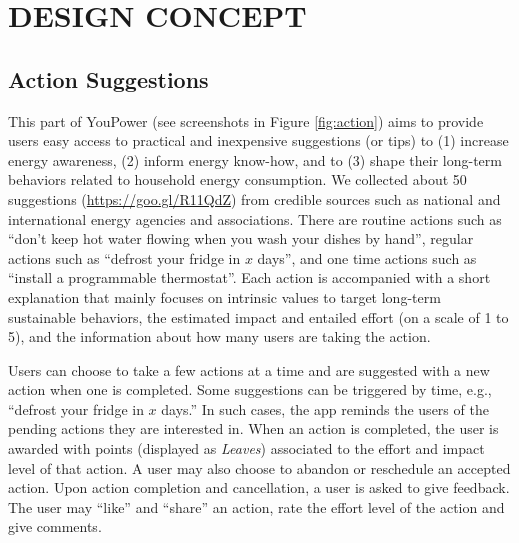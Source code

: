 
\section{\uppercase{Design Concept}}
\label{sect:design_concept}

\subsection{Action Suggestions}
\label{sect:tips}

\begin{figure*}[t!]
\centering
\caption{Action suggestion part of YouPower}
\label{fig:action}
\end{figure*}

This part of YouPower (see screenshots in Figure \ref{fig:action}) aims to provide users easy access to practical and inexpensive suggestions (or tips) to (1) increase energy awareness, (2) inform energy know-how, and to (3) shape their long-term behaviors related to household energy consumption.
% 
We collected about 50 suggestions (\url{https://goo.gl/R11QdZ}) from credible sources such as national and international energy agencies and associations. There are routine actions such as ``don't keep hot water flowing when you wash your dishes by hand'', regular actions such as ``defrost your fridge in $x$ days'', and one time actions such as ``install a programmable thermostat''.  
Each action is accompanied with a short explanation that mainly focuses on intrinsic values to target long-term sustainable behaviors, the estimated impact and entailed effort (on a scale of 1 to 5), and the information about how many users are taking the action. 

Users can choose to take a few actions at a time and are suggested with a new action when one is completed. 
Some suggestions can be triggered by time, e.g., ``defrost your fridge in $x$ days.'' In such cases, the app reminds the users of the pending actions they are interested in. 
%
When an action is completed, the user is awarded with points (displayed as \textit{Leaves}) associated to the effort and impact level of that action. 
A user may also choose to abandon or reschedule an accepted action. 
Upon action completion and cancellation, a user is asked to give feedback. 
The user may ``like'' and ``share'' an action, rate the effort level of the action and give comments. 

